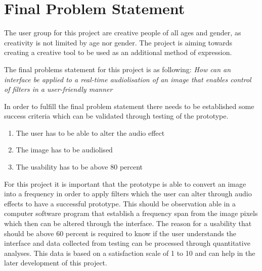 \chapter{Final Problem Statement}\label{ch:finalproblem}

The user group for this project are creative people of all ages and gender, as creativity is not limited by age nor gender. 
The project is aiming towards creating a creative tool to be used as an additional method of expression. 

The final problems statement for this project is as following:
\textit{How can an interface be applied to a real-time audiolisation of an image that enables control of filters in a user-friendly manner}

In order to fulfill the final problem statement there needs to be established some success criteria which can be validated through testing of the prototype. 
\begin{enumerate}
\item The user has to be able to alter the audio effect
\item The image has to be audiolised 
\item The usability has to be above 80 percent
\end{enumerate}

For this project it is important that the prototype is able to convert an image into a frequency in order to apply filters which the user can alter through audio effects to have a successful prototype. This should be observation able in a computer software program that establish a frequency span from the image pixels which then can be altered through the interface. The reason for a usability that should be above 60 percent is required to know if the user understands the interface and data collected from testing can be processed through quantitative analyses. This data is based on a satisfaction scale of 1 to 10 and can help in the later development of this project. 

